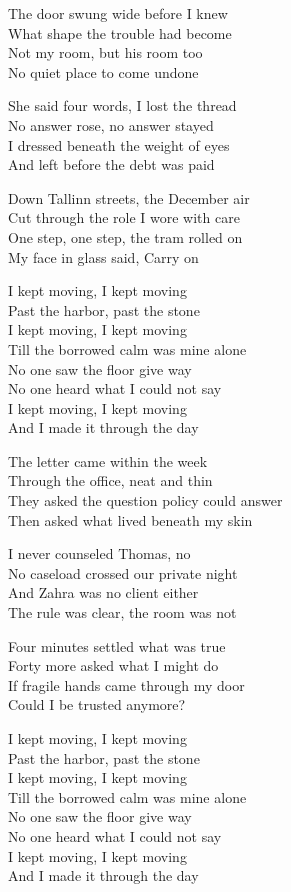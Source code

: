 \begin{lyrics}
The door swung wide before I knew\\
What shape the trouble had become\\
Not my room, but his room too\\
No quiet place to come undone

She said four words, I lost the thread\\
No answer rose, no answer stayed\\
I dressed beneath the weight of eyes\\
And left before the debt was paid

Down Tallinn streets, the December air\\
Cut through the role I wore with care\\
One step, one step, the tram rolled on\\
My face in glass said, Carry on

I kept moving, I kept moving\\
Past the harbor, past the stone\\
I kept moving, I kept moving\\
Till the borrowed calm was mine alone\\
No one saw the floor give way\\
No one heard what I could not say\\
I kept moving, I kept moving\\
And I made it through the day

The letter came within the week\\
Through the office, neat and thin\\
They asked the question policy could answer\\
Then asked what lived beneath my skin

I never counseled Thomas, no\\
No caseload crossed our private night\\
And Zahra was no client either\\
The rule was clear, the room was not

Four minutes settled what was true\\
Forty more asked what I might do\\
If fragile hands came through my door\\
Could I be trusted anymore?

I kept moving, I kept moving\\
Past the harbor, past the stone\\
I kept moving, I kept moving\\
Till the borrowed calm was mine alone\\
No one saw the floor give way\\
No one heard what I could not say\\
I kept moving, I kept moving\\
And I made it through the day


\end{lyrics}
